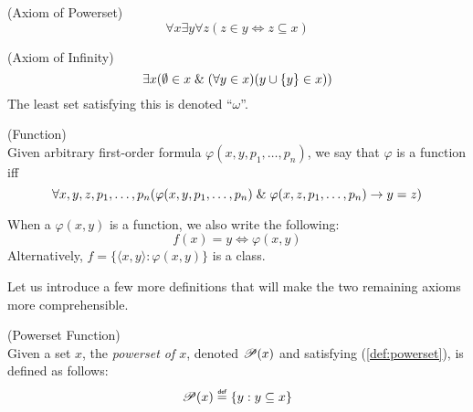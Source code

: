\begin{definition}{(Axiom of Powerset)}\label{def:powerset}
\begin{equation}
\forall x \exists y \forall z (z \in y \iff z \subseteq x) %
\end{equation}
\end{definition}

\begin{definition}{(Axiom of Infinity)}\label{def:infinity} %
\begin{equation}
\exists x (\emptyset \in x \mathrel{\&} (\forall y \in x)(y\cup\{y\} \in x))
\end{equation}
The least set satisfying this is denoted ``$\omega$''.
\end{definition}

\begin{definition}{(Function)}\label{def:function}\\
Given arbitrary first-order formula $\varphi(x, y, p_1, \ldots, p_n)$, we say that $\varphi$ is a function iff
\begin{equation}\label{def:function_formula}
\forall x, y, z, p_1, \ldots, p_n (\varphi(x, y, p_1, \ldots, p_n) \mathrel{\&} \varphi(x, z, p_1, \ldots, p_n) \rightarrow y = z)
\end{equation}
\end{definition}
When a $\varphi(x, y)$ is a function, we also write the following:
\begin{equation}
f(x) = y \iff \varphi(x, y)
\end{equation}
Alternatively, $f = \{\langle x, y \rangle : \varphi(x, y)\}$ is a class.

Let us introduce a few more definitions that will make the two remaining axioms more comprehensible.
\begin{definition}{(Powerset Function)}\\
Given a set $x$, the \emph{powerset of $x$}, denoted $\mathscr{P} (x)$ and satisfying (\ref{def:powerset}), is defined as follows:
\begin{equation}
\power{x} \defeq \{y: y \subseteq x\}
\end{equation}
\end{definition}

